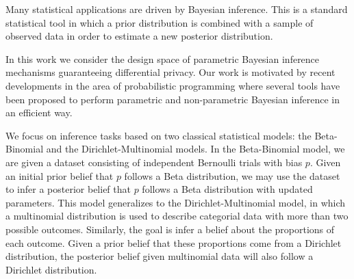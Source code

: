 \documentclass{article}
\begin{document}
Many statistical applications are driven by Bayesian inference.
This is a standard statistical tool in which a prior distribution is combined
with a sample of observed data in order to estimate a new posterior distribution.


In this work we consider the design space of  parametric Bayesian
inference mechanisms guaranteeing differential privacy. Our work is
motivated by recent developments in the area of probabilistic
programming where several tools have been proposed to perform
parametric and non-parametric Bayesian inference in an efficient
way.






We focus on inference tasks based on two classical statistical models: the Beta-Binomial and the
Dirichlet-Multinomial models. In the Beta-Binomial model, we are given a
dataset consisting of independent Bernoulli trials with bias $p$. Given an initial
prior belief that $p$ follows a Beta distribution, we may use the dataset to infer a
posterior belief that $p$ follows a Beta distribution with updated parameters. This model
generalizes to the Dirichlet-Multinomial model, in which a multinomial distribution
is used to describe categorial data with more than two possible outcomes. Similarly, the goal
is infer a belief about the proportions of each outcome. Given a prior belief that these proportions
come from a Dirichlet distribution, the posterior belief given multinomial data will
also follow a Dirichlet distribution.
\end{document}
